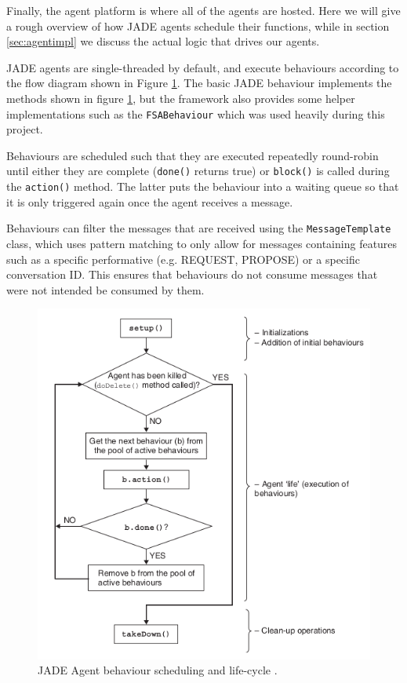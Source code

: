 \documentclass{article}
\begin{document}
Finally, the agent platform is where all of the agents are hosted. Here we will give a rough overview of how JADE agents schedule their functions, while in section \ref{sec:agentimpl} we discuss the actual logic that drives our agents.

JADE agents are single-threaded by default, and execute behaviours according to the flow diagram shown in Figure \ref{fig:behaviour}. The basic JADE behaviour implements the methods shown in figure \ref{fig:behaviour}, but the framework also provides some helper implementations such as the \lstinline{FSABehaviour} which was used heavily during this project. 

Behaviours are scheduled such that they are executed repeatedly round-robin until either they are complete (\lstinline{done()} returns true) or \lstinline{block()} is called during the \lstinline{action()} method. The latter puts the behaviour into a waiting queue so that it is only triggered again once the agent receives a message. 

Behaviours can filter the messages that are received using the \lstinline{MessageTemplate} class, which uses pattern matching to only allow for messages containing features such as a specific performative (e.g. REQUEST, PROPOSE) or a specific conversation ID. This ensures that behaviours do not consume messages that were not intended be consumed by them. 

\begin{figure}[!ht]
	\centering
	\includegraphics[width=0.8\linewidth]{images/behaviour}
	\caption{JADE Agent behaviour scheduling and life-cycle \cite{jade}.}
	\label{fig:behaviour}
\end{figure}
\end{document}
